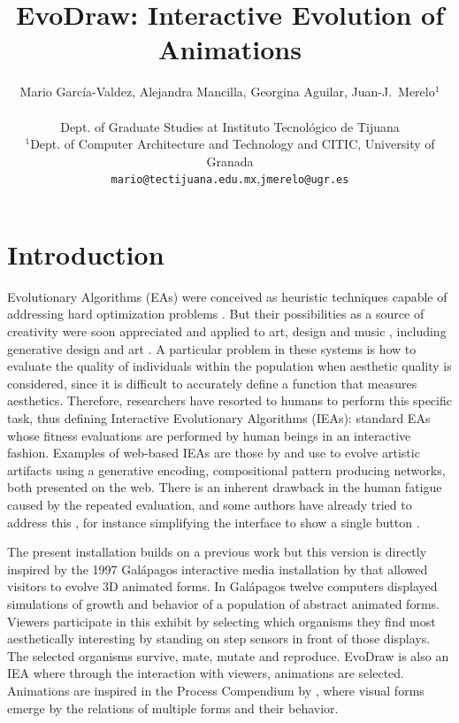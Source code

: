 \documentclass[letterpaper]{article}
\title{EvoDraw: Interactive Evolution of Animations}
\author{ Mario Garc\'ia-Valdez, Alejandra Mancilla, Georgina Aguilar, Juan-J.~Merelo$^1$\\
\mbox{}\\
Dept. of Graduate Studies at Instituto Tecnol\'ogico de Tijuana \\
$^1$Dept. of Computer Architecture and Technology and CITIC, 
University of Granada \\
{\tt mario@tectijuana.edu.mx},{\tt jmerelo@ugr.es}}
\begin{document}
\maketitle


\section{Introduction} 

Evolutionary Algorithms (EAs) were conceived as heuristic techniques 
capable of addressing hard optimization problems 
\citep{DBLP:books/daglib/0015527}. But their possibilities as a source of
creativity were soon appreciated and applied to art, design and music \citep{ie1}, including generative design and
art \citep{Bentley:1999:intro,Sims:1991,todd:1992}.  A particular problem in
these systems is how to evaluate the quality of individuals within the population
when aesthetic quality is considered, since it is difficult to
accurately define a function that measures aesthetics. Therefore, researchers
have resorted to humans to perform this specific task, thus defining Interactive
Evolutionary Algorithms (IEAs): standard EAs whose fitness evaluations are
performed by human beings in an interactive fashion. Examples of web-based IEAs are
those by \cite{picbreeder} and \cite{forms}
use  to evolve artistic artifacts using a generative encoding, compositional
pattern producing networks, both presented on the web.
There is an inherent drawback in the human fatigue caused by the repeated evaluation, and some authors have
already tried to address this \citep{Frade:2010:EvoGAMES}, for instance simplifying the interface to show a single button \cite{Davies2016}. %

The present installation builds on a previous work \citep{garcia2013evospace}
but this version is directly inspired by the 1997 Galápagos interactive 
media installation by \cite{galapagos} that allowed visitors to evolve 3D animated forms. 
In Gal{\'a}pagos twelve computers displayed simulations of growth and 
behavior of a population of abstract animated forms. Viewers
participate in this exhibit by selecting which organisms they find
most aesthetically interesting by standing on step sensors in front 
of those displays. The selected organisms survive, mate, mutate and 
reproduce. EvoDraw is also an IEA where through the interaction
with viewers, animations are selected. Animations are inspired in 
the Process Compendium by \cite{reas:2004}, where visual forms 
emerge by the relations of multiple forms and their behavior. 
\end{document}
